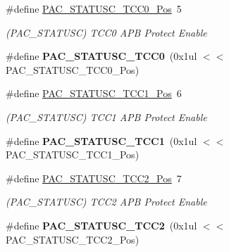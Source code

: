 \begin{DoxyCompactItemize}
\item 
\hypertarget{group___s_a_m_l21___p_a_c_ga8d54294c37278ca81744e8c5281c73ea}{}\#define \hyperlink{group___s_a_m_l21___p_a_c_ga8d54294c37278ca81744e8c5281c73ea}{P\+A\+C\+\_\+\+S\+T\+A\+T\+U\+S\+C\+\_\+\+T\+C\+C0\+\_\+\+Pos}~5\label{group___s_a_m_l21___p_a_c_ga8d54294c37278ca81744e8c5281c73ea}

\begin{DoxyCompactList}\small\item\em (P\+A\+C\+\_\+\+S\+T\+A\+T\+U\+S\+C) T\+C\+C0 A\+P\+B Protect Enable \end{DoxyCompactList}\item 
\hypertarget{group___s_a_m_l21___p_a_c_ga35284256a850ab8987127b450c69645c}{}\#define {\bfseries P\+A\+C\+\_\+\+S\+T\+A\+T\+U\+S\+C\+\_\+\+T\+C\+C0}~(0x1ul $<$$<$ P\+A\+C\+\_\+\+S\+T\+A\+T\+U\+S\+C\+\_\+\+T\+C\+C0\+\_\+\+Pos)\label{group___s_a_m_l21___p_a_c_ga35284256a850ab8987127b450c69645c}

\item 
\hypertarget{group___s_a_m_l21___p_a_c_gac720e25de0d1449e65b940b8f5b6ae02}{}\#define \hyperlink{group___s_a_m_l21___p_a_c_gac720e25de0d1449e65b940b8f5b6ae02}{P\+A\+C\+\_\+\+S\+T\+A\+T\+U\+S\+C\+\_\+\+T\+C\+C1\+\_\+\+Pos}~6\label{group___s_a_m_l21___p_a_c_gac720e25de0d1449e65b940b8f5b6ae02}

\begin{DoxyCompactList}\small\item\em (P\+A\+C\+\_\+\+S\+T\+A\+T\+U\+S\+C) T\+C\+C1 A\+P\+B Protect Enable \end{DoxyCompactList}\item 
\hypertarget{group___s_a_m_l21___p_a_c_ga87406c08268cb0463b948f6c9eefc6fd}{}\#define {\bfseries P\+A\+C\+\_\+\+S\+T\+A\+T\+U\+S\+C\+\_\+\+T\+C\+C1}~(0x1ul $<$$<$ P\+A\+C\+\_\+\+S\+T\+A\+T\+U\+S\+C\+\_\+\+T\+C\+C1\+\_\+\+Pos)\label{group___s_a_m_l21___p_a_c_ga87406c08268cb0463b948f6c9eefc6fd}

\item 
\hypertarget{group___s_a_m_l21___p_a_c_ga363f0ab4f17009945bd276faef4d64ef}{}\#define \hyperlink{group___s_a_m_l21___p_a_c_ga363f0ab4f17009945bd276faef4d64ef}{P\+A\+C\+\_\+\+S\+T\+A\+T\+U\+S\+C\+\_\+\+T\+C\+C2\+\_\+\+Pos}~7\label{group___s_a_m_l21___p_a_c_ga363f0ab4f17009945bd276faef4d64ef}

\begin{DoxyCompactList}\small\item\em (P\+A\+C\+\_\+\+S\+T\+A\+T\+U\+S\+C) T\+C\+C2 A\+P\+B Protect Enable \end{DoxyCompactList}\item 
\hypertarget{group___s_a_m_l21___p_a_c_ga7c73bd22529611474e3fbdd7e0c73a99}{}\#define {\bfseries P\+A\+C\+\_\+\+S\+T\+A\+T\+U\+S\+C\+\_\+\+T\+C\+C2}~(0x1ul $<$$<$ P\+A\+C\+\_\+\+S\+T\+A\+T\+U\+S\+C\+\_\+\+T\+C\+C2\+\_\+\+Pos)\label{group___s_a_m_l21___p_a_c_ga7c73bd22529611474e3fbdd7e0c73a99}


\end{DoxyCompactItemize}
